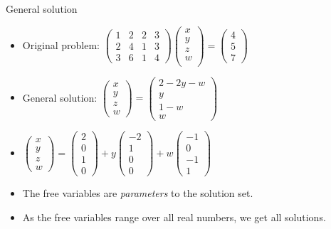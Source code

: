 \documentclass{beamer}
\begin{document}
\begin{frame}{General solution}

\begin{itemize}
\item
Original problem: $
\begin{pmatrix}
1 & 2 & 2 & 3 \\
2 & 4 & 1 & 3 \\
3 & 6 & 1 & 4
\end{pmatrix}
\begin{pmatrix}
x \\
y \\
z \\
w \\
\end{pmatrix}
=
\begin{pmatrix}
4 \\
5 \\
7
\end{pmatrix}
$
\item
General solution: $
\begin{pmatrix}
x \\ y \\ z \\ w
\end{pmatrix}
=
\begin{pmatrix}
2 -2y - w \\
y \\
1-w \\
w
\end{pmatrix}
$
\item
$
\begin{pmatrix}
x \\ y \\ z \\ w
\end{pmatrix}
=
\begin{pmatrix}
2 \\
0 \\
1 \\
0
\end{pmatrix}
+
y
\begin{pmatrix}
-2 \\
1 \\
0 \\
0
\end{pmatrix}
+
w
\begin{pmatrix}
-1 \\
0 \\
-1 \\
1
\end{pmatrix}
$
\item The free variables are \emph{parameters} to the solution set.
\item As the free variables range over all real numbers, we get all solutions.
\end{itemize}
\end{frame}
\end{document}
